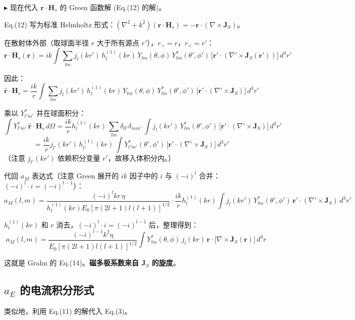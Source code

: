 $\blacktriangleright$ 现在代入 $\mathbf{r}\cdot\mathbf{H}_s$ 的 Green 函数解 (Eq.(12) 的解)。

Eq.(12) 写为标准 Helmholtz 形式：$(\nabla^2+k^2)(\mathbf{r}\cdot\mathbf{H}_s) = -\mathbf{r}\cdot(\nabla\times\mathbf{J}_S)$。

在散射体外部（取球面半径 $r$ 大于所有源点 $r'$），$r_> = r$，$r_< = r'$：
$$
\mathbf{r}\cdot\mathbf{H}_s(\mathbf{r}) = ik\int \sum_{lm} j_l(kr')\,h_l^{(1)}(kr)\,
  Y_{lm}(\theta,\phi)\,Y_{lm}^*(\theta',\phi')\,
  \bigl[\mathbf{r}'\cdot(\nabla'\times\mathbf{J}_S(\mathbf{r}'))\bigr]\,d^3r'
$$

因此：
$$
\hat{\mathbf{r}}\cdot\mathbf{H}_s = \frac{ik}{r}\int \sum_{lm} j_l(kr')\,h_l^{(1)}(kr)\,
  Y_{lm}(\theta,\phi)\,Y_{lm}^*(\theta',\phi')\,
  \bigl[\mathbf{r}'\cdot(\nabla'\times\mathbf{J}_S)\bigr]\,d^3r'
$$

乘以 $Y_{l'm'}^*$ 并在球面积分：
$$
\int Y_{l'm'}^*\,\hat{\mathbf{r}}\cdot\mathbf{H}_s\,d\Omega
= \frac{ik}{r} h_l^{(1)}(kr)\,
  \sum_{lm} \delta_{ll'}\delta_{mm'}\,
  \int j_l(kr')\,Y_{lm}^*(\theta',\phi')\,
  \bigl[\mathbf{r}'\cdot(\nabla'\times\mathbf{J}_S)\bigr]\,d^3r'
$$
$$
= \frac{ik}{r} j_{l'}(kr')\,h_{l'}^{(1)}(kr)\,
  \int Y_{l'm'}^*(\theta',\phi')\,
  \bigl[\mathbf{r}'\cdot(\nabla'\times\mathbf{J}_S)\bigr]\,d^3r'
$$
（注意 $j_{l'}(kr')$ 依赖积分变量 $r'$，故移入体积分内。）

代回 $a_M$ 表达式（注意 Green 展开的 $ik$ 因子中的 $i$ 与 $(-i)^l$ 合并：$(-i)^l\cdot i=(-i)^{l-1}$）：
$$
a_M(l,m) = \frac{(-i)^{l}kr\,\eta}{h_l^{(1)}(kr)E_0[\pi(2l+1)l(l+1)]^{1/2}}
  \cdot\frac{ik}{r} h_l^{(1)}(kr)
  \int j_l(kr')\,Y_{lm}^*(\theta',\phi')\,
  \mathbf{r}'\cdot(\nabla'\times\mathbf{J}_S)\,d^3r'
$$

$h_l^{(1)}(kr)$ 和 $r$ 消去，$(-i)^l\cdot i=(-i)^{l-1}$ 后，整理得到：
\begin{equation}
  \boxed{\;
    a_M(l,m) = \frac{(-i)^{l-1}k^2\eta}{E_0[\pi(2l+1)l(l+1)]^{1/2}}
    \int Y_{lm}^*(\theta,\phi)\,j_l(kr)\,
    \mathbf{r}\cdot\bigl[\nabla\times\mathbf{J}_S(\mathbf{r})\bigr]\,d^3r
    \;}
  \label{eq:aM_J}
\end{equation}

这就是 Grahn 的 Eq.(14)。\textbf{磁多极系数来自 $\mathbf{J}_S$ 的旋度}。

\subsection{$a_E$ 的电流积分形式}

类似地，利用 Eq.(11) 的解代入 Eq.(3)。

